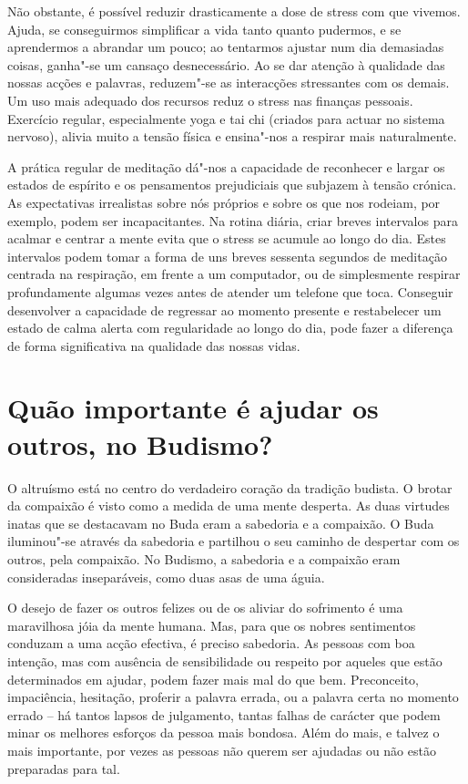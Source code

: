 Não obstante, é possível reduzir drasticamente a dose de stress com que
vivemos. Ajuda, se conseguirmos simplificar a vida tanto quanto
pudermos, e se aprendermos a abrandar um pouco; ao tentarmos ajustar num
dia demasiadas coisas, ganha"-se um cansaço desnecessário. Ao se dar
atenção à qualidade das nossas acções e palavras, reduzem"-se as
interacções stressantes com os demais. Um uso mais adequado dos recursos
reduz o stress nas finanças pessoais. Exercício regular, especialmente
yoga e tai chi (criados para actuar no sistema nervoso), alivia muito a
tensão física e ensina"-nos a respirar mais naturalmente.

A prática regular de meditação dá"-nos a capacidade de reconhecer e
largar os estados de espírito e os pensamentos prejudiciais que subjazem
à tensão crónica. As expectativas irrealistas sobre nós próprios e sobre
os que nos rodeiam, por exemplo, podem ser incapacitantes. Na rotina
diária, criar breves intervalos para acalmar e centrar a mente evita que
o stress se acumule ao longo do dia. Estes intervalos podem tomar a
forma de uns breves sessenta segundos de meditação centrada na
respiração, em frente a um computador, ou de simplesmente respirar
profundamente algumas vezes antes de atender um telefone que toca.
Conseguir desenvolver a capacidade de regressar ao momento presente e
restabelecer um estado de calma alerta com regularidade ao longo do dia,
pode fazer a diferença de forma significativa na qualidade das nossas
vidas.

\section{Quão importante é ajudar os outros, no Budismo?}

O altruísmo está no centro do verdadeiro coração da tradição budista. O
brotar da compaixão é visto como a medida de uma mente desperta. As duas
virtudes inatas que se destacavam no Buda eram a sabedoria e a
compaixão. O Buda iluminou"-se através da sabedoria e partilhou o seu
caminho de despertar com os outros, pela compaixão. No Budismo, a
sabedoria e a compaixão eram consideradas inseparáveis, como duas asas
de uma águia.

O desejo de fazer os outros felizes ou de os aliviar do sofrimento é uma
maravilhosa jóia da mente humana. Mas, para que os nobres sentimentos
conduzam a uma acção efectiva, é preciso sabedoria. As pessoas com boa
intenção, mas com ausência de sensibilidade ou respeito por aqueles que
estão determinados em ajudar, podem fazer mais mal do que bem.
Preconceito, impaciência, hesitação, proferir a palavra errada, ou a
palavra certa no momento errado -- há tantos lapsos de julgamento,
tantas falhas de carácter que podem minar os melhores esforços da pessoa
mais bondosa. Além do mais, e talvez o mais importante, por vezes as
pessoas não querem ser ajudadas ou não estão preparadas para tal.

